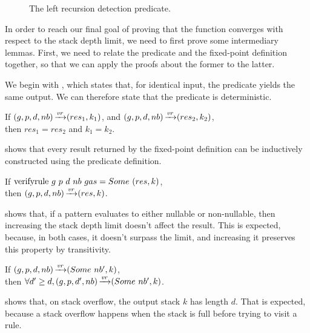 \begin{figure}
    
    \caption{The left recursion detection predicate.}
    \label{fig:verifyrule}
\end{figure}

In order to reach our final goal
of proving that the function converges
with respect to the stack depth limit,
we need to first prove some intermediary lemmas.
First, we need to relate the predicate and
the fixed-point definition together,
so that we can apply the proofs about the
former to the latter.

We begin with
,
which states that,
for identical input,
the predicate yields the same output.
We can therefore state
that the predicate is deterministic.

\begin{lemma}
    If $(g,p,d,nb) \operatorname{\xrightarrow{\mathit{vr}}} (res_1,k_1)$,
    and $(g,p,d,nb) \operatorname{\xrightarrow{\mathit{vr}}} (res_2,k_2)$, \\
    then $res_1 = res_2$ and $k_1 = k_2$.
    \label{lemma:vr-determinism}
\end{lemma}

 shows that
every result returned by the fixed-point definition
can be inductively constructed using the predicate definition.

\begin{lemma}
    If $\text{verifyrule}{}\ g\ p\ d\ nb\ gas = Some\ (res, k)$, \\
    then $(g,p,d,nb) \operatorname{\xrightarrow{\mathit{vr}}} (res,k)$.
    \label{lemma:vr-follows}
\end{lemma}

 shows that,
if a pattern evaluates to either nullable or non-nullable,
then increasing the stack depth limit
doesn't affect the result.
This is expected,
because, in both cases,
it doesn't surpass the limit,
and increasing it preserves this property
by transitivity.

\begin{lemma}%
    If $(g,p,d,nb) \operatorname{\xrightarrow{\mathit{vr}}} (Some\ nb',k)$, \\
    then $\forall d' \ge d, (g,p,d',nb) \operatorname{\xrightarrow{\mathit{vr}}} (Some\ nb',k)$.
    \label{lemma:stack-depth-convergence-not-lr-pattern}
\end{lemma}

 shows that,
on stack overflow,
the output stack $k$ has length $d$.
That is expected,
because a stack overflow happens
when the stack is full
before trying to visit a rule.

